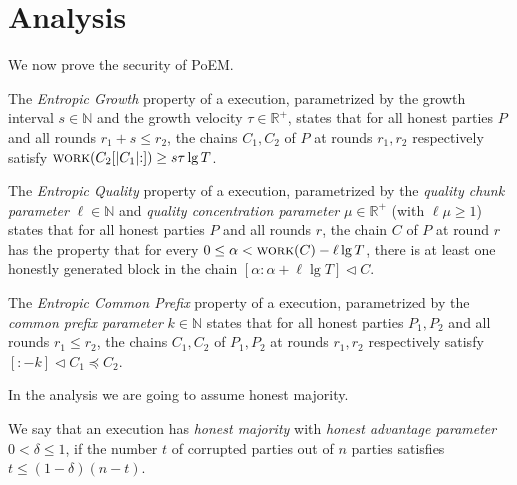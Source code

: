 \section{Analysis}

We now prove the security of PoEM.

\begin{definition}
  The \emph{Entropic Growth} property of
  a \poem execution,
  parametrized by the growth interval $s \in \mathbb{N}$
  and the growth velocity $\tau \in \mathbb{R}^+$,
  states that for
  all honest parties $P$ and all rounds $r_1 + s \leq r_2$,
  the chains $C_1, C_2$ of $P$ at rounds $r_1, r_2$ respectively
  satisfy $\textsc{work}(C_2[{|C_1|}{:}]) \geq s \tau \lg T$.
\end{definition}

\begin{definition}
  The \emph{Entropic Quality} property of
  a \poem execution, parametrized by the \emph{quality chunk parameter} $\ell \in \mathbb{N}$
  and \emph{quality concentration parameter} $\mu \in \mathbb{R}^+$
  (with $\ell \mu \geq 1$)
  states that for
  all honest parties $P$ and all rounds $r$,
  the chain $C$ of $P$ at round $r$
  has the property that
  for every $0 \leq \alpha < \textsc{work}(C) - \ell \lg T$,
  there is at least one honestly generated block in the chain
  $[{\alpha}{:}{\alpha + \ell \lg T}] \lhd C$.
\end{definition}

\begin{definition}
  The \emph{Entropic Common Prefix} property of
  a \poem execution, parametrized by the \emph{common prefix parameter} $k \in \mathbb{N}$
  states that for
  all honest parties $P_1, P_2$
  and all rounds $r_1 \leq r_2$,
  the chains $C_1, C_2$ of $P_1, P_2$ at rounds $r_1, r_2$ respectively
  satisfy $[{:}{-k}] \lhd C_1 \preceq C_2$.
\end{definition}

In the analysis we are going to assume honest majority.

\begin{definition}
  We say that an execution has \emph{honest majority} with \emph{honest advantage parameter}
  $0 < \delta \leq 1$, if the number $t$ of corrupted parties out of
  $n$ parties satisfies $t \leq (1 - \delta) (n - t)$.
\end{definition}

